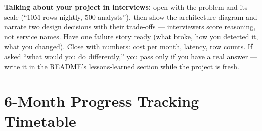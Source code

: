 \documentclass[11pt, a4paper]{article}
\begin{document}
\noindent\textbf{Talking about your project in interviews:} open with the problem and its scale (``10M rows nightly, 500 analysts''), then show the architecture diagram and narrate two design decisions with their trade-offs --- interviewers score reasoning, not service names. Have one failure story ready (what broke, how you detected it, what you changed). Close with numbers: cost per month, latency, row counts. If asked ``what would you do differently,'' you pass only if you have a real answer --- write it in the README's lessons-learned section while the project is fresh.

\newpage
\section{6-Month Progress Tracking Timetable}
\end{document}
